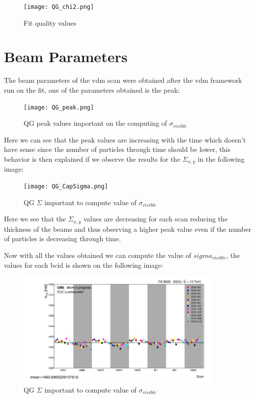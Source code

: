 \begin{figure}[H]
    \centering
    \texttt{[image: QG\_chi2.png]}
    \caption{Fit quality values}
    \label{fig:QGchi2}
\end{figure}



\section{Beam Parameters}

The beam parameters of the vdm scan were obtained after the vdm framework run on the fit, one of the parameters obtained is the peak:

\begin{figure}[H]
    \centering
    \texttt{[image: QG\_peak.png]}
    \caption{QG peak values important on the computing of $\sigma_{visible}$}
    \label{fig:QGpeak}
\end{figure}

Here we can see that the peak values are increasing with the time which doesn't have sense since the number of particles through time should be lower, this behavior is then explained if we observe the results for the $\Sigma_{x, y}$ in the following image:

\begin{figure}[H]
    \centering
    \texttt{[image: QG\_CapSigma.png]}
    \caption{QG $\Sigma$ important to compute value of $\sigma_{visible}$}
    \label{fig:QGcapsigma}
\end{figure}

Here we see that the $\Sigma_{x, y}$ values are decreasing for each scan reducing the thickness of the beams and thus observing a higher peak value even if the number of particles is decreasing through time. 

Now with all the values obtained we can compute the value of $sigma_{visible}$, the values for each bcid is shown on the following image: 

\begin{figure}[H]
    \centering
    \includegraphics[width=0.9\textwidth]{sigbcid.png}
    \caption{QG $\Sigma$ important to compute value of $\sigma_{visible}$}
    \label{fig:sigbcid}
\end{figure}


